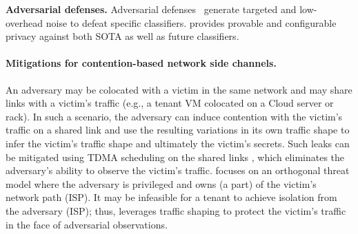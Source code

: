 \textbf{Adversarial defenses.}
Adversarial defenses~\cite{rahman2020mockingbird, hou2020wf, abusnaina2020dfd,
shan2021dolos, nasr2021defeating, gong2022surakav}
generate targeted and low-overhead noise to defeat specific classifiers.
{\sys} provides provable and configurable privacy against both SOTA as
well as future classifiers.


\paragraph{Mitigations for contention-based network side channels.}
An adversary may be colocated with a victim in the same network and may share
links with a victim’s traffic (e.g., a tenant VM colocated on a Cloud server or
rack). In such a scenario, the adversary can induce contention with the victim’s
traffic on a shared link and use the resulting variations in its own traffic
shape to infer the victim’s traffic shape and ultimately the victim’s secrets.
Such leaks can be mitigated using TDMA
scheduling on the shared links \cite{vattikonda2012tdma, beams2021ifs},
which eliminates the
adversary’s ability to observe the victim’s traffic. {\sys} focuses
on an orthogonal threat model where the adversary is privileged and owns (a
part) of the victim’s network path (\eg ISP). It may be infeasible for a tenant
to achieve isolation from the adversary (ISP); thus, {\sys} leverages traffic
shaping to protect the victim’s traffic in the face of adversarial observations.
\fi

